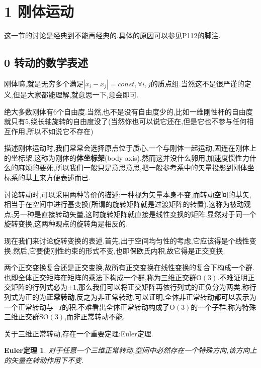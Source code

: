 \documentclass[UTF8]{article}
\begin{document}
\section*{1 刚体运动}
	
	这一节的讨论是经典到不能再经典的.具体的原因可以参见\cite{LiuChuan}P112的脚注.
	
\subsection*{0 转动的数学表述}
	
	刚体嘛,就是无穷多个满足$|x_i-x_j|=const,\forall i,j$的质点组.当然这不是很严谨的定义,但是大家都能理解,就意思一下,意会即可.
	
	绝大多数刚体有6个自由度.当然,也不是没有自由度少的,比如一维刚性杆的自由度就只有5,绕长轴旋转的自由度没了(当然你也可以说它还在,但是它也不参与任何相互作用,所以不如说它不存在)
	
	描述刚体运动时,我们常常会选择原点位于质心,一个与刚体一起运动,固连在刚体上的坐标架.这称为刚体的\textbf{体坐标架}(body axis).然而这并没什么卵用,加速度惯性力什么的麻烦的要死,所以我们一般只是意思意思,把一般参考系中的矢量投影到刚体坐标系的基上来方便表述而已.
	
	讨论转动时,可以采用两种等价的描述:一种视为矢量本身不变,而转动空间的基矢,相当于在空间中进行基变换(所谓的旋转矩阵就是过渡矩阵的转置),这称为被动观点;另一种是直接转动矢量,这时旋转矩阵就直接是线性变换的矩阵.显然对于同一个旋转变换,这两种观点的旋转角是相反的.
	
	现在我们来讨论旋转变换的表述.首先,出于空间均匀性的考虑,它应该得是个线性变换.然后,它要使刚性约束的形式不变,也即保欧氏内积,故它得是正交变换.
	
	两个正交变换复合还是正交变换,故所有正交变换在线性变换的复合下构成一个群.也即全体正交矩阵在矩阵的乘法下构成一个群,称为三维正交群$\mathrm{O(3)}$.不难证明正交矩阵的行列式必为$\pm1$,那么我们可以将正交矩阵再依行列式的正负分为两类.称行列式为正的为\textbf{正常转动},反之为非正常转动.可以证明,全体非正常转动都可以表示为一个正常转动与$-I$的积.不难看出全体正常转动构成了$\mathrm{O(3)}$的一个子群,称为特殊三维正交群$\mathrm{SO(3)}$,而非正常转动不能.
	
	关于三维正常转动,存在一个重要定理:Euler定理.
	
	\newtheorem*{Euler}{Euler定理}
	
	\begin{Euler}
		对于任意一个三维正常转动,空间中必然存在一个特殊方向,该方向上的矢量在转动作用下不变.
	\end{Euler}
	
\end{document}
